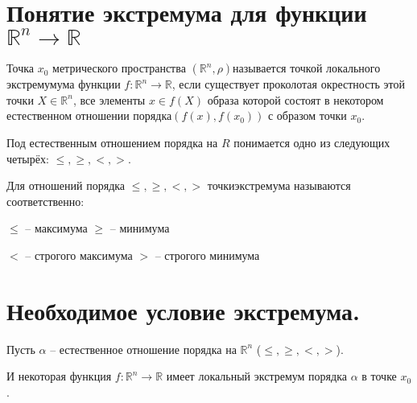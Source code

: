 \section{Понятие экстремума для функции\linebreak $\mathbb{R}^n \to \mathbb{R}$}
\begin{ftdef}
Точка $x_0$ метрического пространства $(\mathbb{R}^n, \rho)$\linebreak называется точкой локального экстремумума функции $f: \mathbb{R}^n \to \mathbb{R}$, если существует проколотая окрестность этой точки $X \in \mathbb{R}^n$, все элементы $x \in f(X)$ образа которой состоят в некотором естественном отношении порядка\linebreak $(f(x), f(x_0))$ с образом точки $x_0$.

Под естественным отношением порядка на $R$ понимается одно из следующих четырёх: $\leq, \geq, <, >$.
\end{ftdef}

\begin{ftdef}
Для отношений порядка $\leq, \geq, <, >$ точки\linebreak экстремума называются соответственно:

$\leq$ -- максимума
$\geq$ -- минимума

$<$ -- строгого максимума
$>$ -- строгого минимума

\end{ftdef}
\section{Необходимое условие экстремума.}
\parindent=0cm
Пусть $\alpha$ -- естественное отношение порядка на $\mathbb{R}^n$ ($\leq, \geq, <, >$).

И некоторая функция $f: \mathbb{R}^n \to \mathbb{R}$ имеет локальный экстремум порядка $\alpha$ в точке $x_0$.

